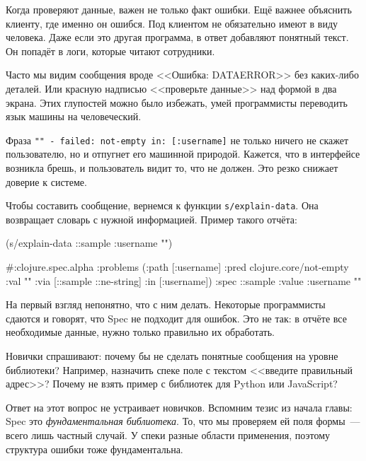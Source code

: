 
\label{spec-messages}

Когда проверяют данные, важен не только факт ошибки. Ещё важнее объяснить
клиенту, где именно он ошибся. Под клиентом не обязательно имеют в виду
человека. Даже если это другая программа, в ответ добавляют понятный текст. Он
попадёт в логи, которые читают сотрудники.

Часто мы видим сообщения вроде <<Ошибка: DATAERROR>> без каких-либо деталей. Или
красную надписью <<проверьте данные>> над формой в два экрана. Этих глупостей
можно было избежать, умей программисты переводить язык машины на человеческий.


Фраза \verb|"" - failed: not-empty in: [:username]| не только ничего не скажет
пользователю, но и отпугнет его машинной природой. Кажется, что в интерфейсе
возникла брешь, и пользователь видит то, что не должен. Это резко снижает
доверие к системе.

Чтобы составить сообщение, вернемся к функции \verb|s/explain-data|.  Она
возвращает словарь с нужной информацией. Пример такого отчёта:

\begin{english}
  \begin{clojure}
(s/explain-data ::sample {:username ""})

#:clojure.spec.alpha
{:problems
 ({:path [:username]
   :pred clojure.core/not-empty
   :val ""
   :via [::sample ::ne-string]
   :in [:username]})
 :spec ::sample
 :value {:username ""}}
  \end{clojure}
\end{english}


На первый взгляд непонятно, что с ним делать. Некоторые программисты сдаются и
говорят, что Spec не подходит для ошибок. Это не так: в отчёте все
необходимые данные, нужно только правильно их обработать.

Новички спрашивают: почему бы не сделать понятные сообщения на уровне
библиотеки? Например, назначить спеке поле с текстом <<введите правильный
адрес>>? Почему не взять пример с библиотек для Python или JavaScript?


Ответ на этот вопрос не устраивает новичков. Вспомним тезис из начала главы:
Spec это \emph{фундаментальная библиотека}. То, что мы проверяем ей поля
формы~--- всего лишь частный случай. У спеки разные области применения, поэтому
структура ошибки тоже фундаментальна.

